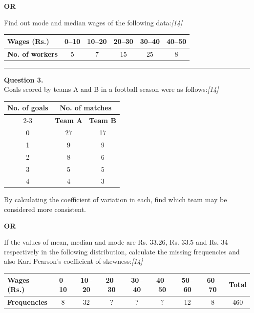 \documentclass[11pt,a4paper]{article}
\newcommand{\pts}[1]{\hfill   \textit{[#1]}}
\begin{document}
\centerline{   \textbf{OR}}

Find out mode and median wages of the following data:\pts{14}

\begin{center}
\renewcommand{\arraystretch}{1.2}

\begin{tabular}{|l|c|c|c|c|c|}
\hline
   \textbf{Wages (Rs.)} & 0--10 & 10--20 & 20--30 & 30--40 & 40--50 \\ \hline
   \textbf{No. of workers} & 5 & 7 & 15 & 25 & 8 \\ \hline
\end{tabular}
\end{center}

\medskip\rule{\linewidth}{0.2pt}




\noindent   \textbf{Question 3.} \\
Goals scored by teams A and B in a football season were as follows:\pts{14}

\begin{center}
\renewcommand{\arraystretch}{1.2}

\begin{tabular}{|c|c|c|}
\hline
   \textbf{No. of goals} & \multicolumn{2}{c|}{   \textbf{No. of matches}} \\ \cline{2-3}
&   \textbf{Team A} &   \textbf{Team B} \\ \hline
0 & 27 & 17 \\
1 & 9 & 9 \\
2 & 8 & 6 \\
3 & 5 & 5 \\
4 & 4 & 3 \\ \hline
\end{tabular}
\end{center}
By calculating the coefficient of variation in each, find which team may be considered more consistent.

\centerline{   \textbf{OR}}

If the values of mean, median and mode are Rs. 33.26, Rs. 33.5 and Rs. 34 respectively in the following distribution, calculate the missing frequencies and also Karl Pearson's coefficient of skewness:\pts{14}

\begin{center}
\renewcommand{\arraystretch}{1.2}

\begin{tabular}{|l|c|c|c|c|c|c|c|c|}
\hline
   \textbf{Wages (Rs.)} & 0--10 & 10--20 & 20--30 & 30--40 & 40--50 & 50--60 & 60--70 &   \textbf{Total} \\ \hline
   \textbf{Frequencies} & 8 & 32 & ? & ? & ? & 12 & 8 & 460 \\ \hline
\end{tabular}
\end{center}
\end{document}
